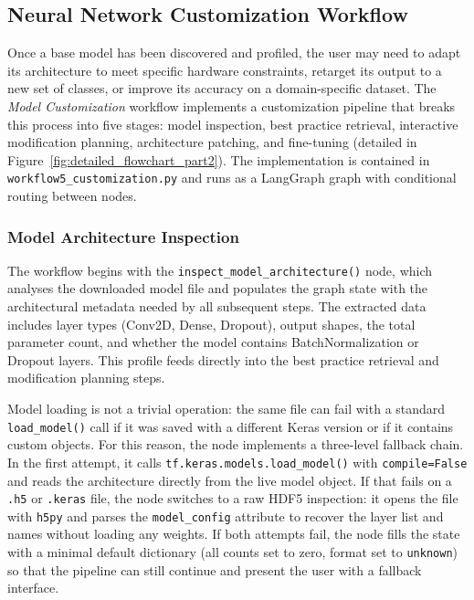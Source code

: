 \subsection{Neural Network Customization Workflow}
\label{sec:customization}

Once a base model has been discovered and profiled, the user may need to adapt its architecture to meet specific hardware constraints, retarget its output to a new set of classes, or improve its accuracy on a domain-specific dataset. The \textit{Model Customization} workflow implements a customization pipeline that breaks this process into five stages: model inspection, best practice retrieval, interactive modification planning, architecture patching, and fine-tuning (detailed in Figure~\ref{fig:detailed_flowchart_part2}). The implementation is contained in \texttt{workflow5\_customization.py} and runs as a LangGraph graph with conditional routing between nodes.

\subsubsection{Model Architecture Inspection}

The workflow begins with the \texttt{inspect\_\allowbreak model\_\allowbreak architecture()} node, which analyses the downloaded model file and populates the graph state with the architectural metadata needed by all subsequent steps. The extracted data includes layer types (Conv2D, Dense, Dropout), output shapes, the total parameter count, and whether the model contains BatchNormalization or Dropout layers. This profile feeds directly into the best practice retrieval and modification planning steps.

Model loading is not a trivial operation: the same file can fail with a standard \texttt{load\_model()} call if it was saved with a different Keras version or if it contains custom objects. For this reason, the node implements a three-level fallback chain. In the first attempt, it calls \texttt{tf.keras.models.load\_model()} with \texttt{compile=False} and reads the architecture directly from the live model object. If that fails on a \texttt{.h5} or \texttt{.keras} file, the node switches to a raw HDF5 inspection: it opens the file with \texttt{h5py} and parses the \texttt{model\_config} attribute to recover the layer list and names without loading any weights. If both attempts fail, the node fills the state with a minimal default dictionary (all counts set to zero, format set to \texttt{unknown}) so that the pipeline can still continue and present the user with a fallback interface.

